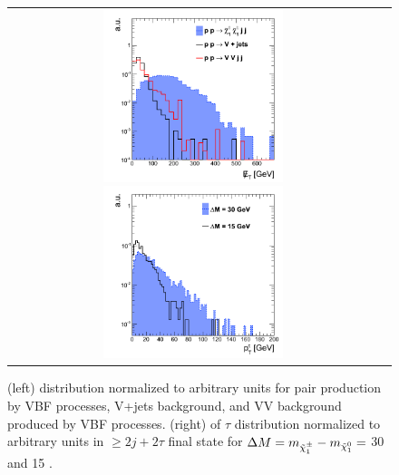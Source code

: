 \begin{figure}[tbh!]
	\centering
	\begin{tabular}{cc}
		\includegraphics[width=0.50\textwidth]{analysis/pics/VBFMet.png}
		\includegraphics[width=0.50\textwidth]{analysis/pics/Pheno_VBF_TauPt.png} 		
	\end{tabular}
	\caption{(left) \met distribution normalized to arbitrary units for \charginopm \charginopm pair production by VBF processes, V+jets background, and VV background produced by VBF processes. (right) \pt of \ensuremath{\tau} distribution normalized to arbitrary units in \ensuremath{\geq 2j + 2\tau} ﬁnal state for \ensuremath{\Delta M = m_{\charginopm} - m_{\neutralinoone} =} 30 \gev and 15 \gev.}
	\label{fig:VBF_met_pttau}
\end{figure}

